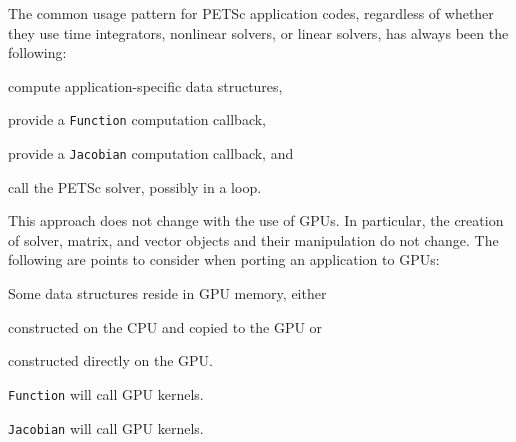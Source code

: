 \documentclass[5p,times]{elsarticle}
\newenvironment{titemize} %
        {\begin{list}{\labelitemi}{
                \setlength{\topsep}{0pt}
                \setlength{\parskip}{0pt}
                \setlength{\itemsep}{0pt}
                \setlength{\parsep}{0pt}
                \setlength{\leftmargin}{23pt}
                \setlength{\labelwidth}{23pt}
        }}
        {\end{list}}
\begin{document}
The common usage pattern for PETSc application codes, regardless of whether they
use time integrators, nonlinear solvers, or linear solvers, has always
been the following: 
\begin{titemize}
    \item compute application-specific data structures,
    \item provide a {\tt  Function} computation callback, 
    \item provide a {\tt  Jacobian} computation callback, and
    \item call the PETSc solver, possibly in a loop.
\end{titemize}
This approach does not change with the use of GPUs.  In particular, the creation of
solver, matrix, and vector objects and their manipulation do not
change. The following are points to consider when porting an application to GPUs:
\begin{titemize}
    \item Some data structures reside in GPU memory, either
    \begin{titemize}
        \item constructed on the CPU and copied to the GPU or
        \item constructed directly on the GPU.
    \end{titemize}
    \item {\tt  Function} will call GPU kernels.
    \item {\tt  Jacobian} will call GPU kernels.
\end{titemize}
\end{document}
